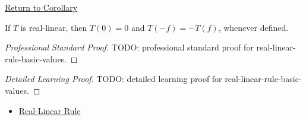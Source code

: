 \newpage
{}
\label{prf:real-linear-rule-basic-values}

\begin{remark*}[Return]
\hyperref[cor:real-linear-rule-basic-values]{Return to Corollary}
\end{remark*}

\begin{corollary*}
If \(T\) is real-linear, then \(T(0)=0\) and \(T(-f)=-T(f)\), whenever defined.
\end{corollary*}

\begin{proof}[Professional Standard Proof]
\LRAProofBodyStart
TODO: professional standard proof for real-linear-rule-basic-values.
\end{proof}

\begin{proof}[Detailed Learning Proof]
\LRAProofBodyStart
TODO: detailed learning proof for real-linear-rule-basic-values.
\end{proof}

\begin{remark*}
\end{remark*}

\begin{dependencies}
\begin{itemize}
  \item \hyperref[def:real-linear-rule]{Real-Linear Rule}
\end{itemize}
\end{dependencies}

\clearpage
